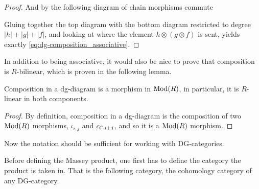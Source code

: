 \begin{proof}
    And by \cite[Definition 6.2.1]{Borceux_1994} the following diagram of chain morphisms commute
    \begin{center}
    \end{center}
    Gluing together the top diagram with the bottom diagram restricted to degree \( |h| + |g| + |f| \), and looking at where the element \( h \otimes (g \otimes f) \) is sent, yields exactly \autoref{eq:dg-composition_associative}.
\end{proof}

In addition to being associative, it would also be nice to prove that composition is \( R \)-bilinear, which is proven in the following lemma.

\begin{lemma}
    Composition in a dg-diagram is a morphism in \( \operatorname{Mod}(R) \), in particular, it is \( R \)-linear in both components.
\end{lemma}
\begin{proof}
    By definition, composition in a dg-diagram is the composition of two \( \operatorname{Mod}(R) \) morphisms, \( \iota_{i, j} \) and \( c_{{\mathcal{C}}, i + j} \), and so it is a \( \operatorname{Mod}(R) \) morphism.
\end{proof}

Now the notation should be sufficient for working with DG-categories.

Before defining the Massey product, one first has to define the category the product is taken in. That is the following category, the cohomology category of any DG-category.

